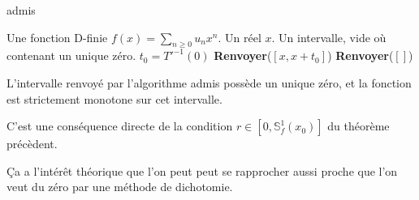 \documentclass[a4paper,10.5pt]{article}
\begin{document}
	
	\begin{algorithm}
		\caption{admis}
		
		\begin{algorithmic}[1]
			\REQUIRE Une fonction D-finie $f(x)=\sum_{n \geq 0} u_nx^{n}$. Un réel $x$. 
			\ENSURE Un intervalle, vide où contenant un unique zéro.
			\STATE $t_0=T'^{-1}(0)$
			\STATE \textbf{Renvoyer}($[x,x+t_0]$)
			\ENDIF
			\STATE \textbf{Renvoyer}($[]$)
		\end{algorithmic}
	\end{algorithm}

	\begin{proposition}
		L'intervalle renvoyé par l'algorithme admis possède un unique zéro, et la fonction est strictement monotone sur cet intervalle.
	\end{proposition}
	\begin{demonstration}
		C'est une conséquence directe de la condition $r\in [0,\mathbb{S}_{f}^{1}(x_0)]$ du théorème précèdent.
	\end{demonstration}
	
	Ça a l'intérêt théorique que l'on peut peut se rapprocher aussi proche que l'on veut du zéro par une méthode de dichotomie.
	
\end{document}
